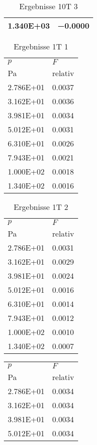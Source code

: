 \begin{table}
\begin{tabular}{l l }
\num{1.340E+03}&\num{-0.0000}\\
\bottomrule
\end{tabular}\caption{Ergebnisse 10T 3}\end{table}\begin{table}\begin{tabular}{l l }
\toprule
$p$&$F$\\
 Pa & relativ \\\midrule
\num{2.786E+01}&\num{0.0037}\\
\num{3.162E+01}&\num{0.0036}\\
\num{3.981E+01}&\num{0.0034}\\
\num{5.012E+01}&\num{0.0031}\\
\num{6.310E+01}&\num{0.0026}\\
\num{7.943E+01}&\num{0.0021}\\
\num{1.000E+02}&\num{0.0018}\\
\num{1.340E+02}&\num{0.0016}\\
\bottomrule
\end{tabular}\caption{Ergebnisse 1T 1}\end{table}\begin{table}\begin{tabular}{l l }
\toprule
$p$&$F$\\
 Pa & relativ \\\midrule
\num{2.786E+01}&\num{0.0031}\\
\num{3.162E+01}&\num{0.0029}\\
\num{3.981E+01}&\num{0.0024}\\
\num{5.012E+01}&\num{0.0016}\\
\num{6.310E+01}&\num{0.0014}\\
\num{7.943E+01}&\num{0.0012}\\
\num{1.000E+02}&\num{0.0010}\\
\num{1.340E+02}&\num{0.0007}\\
\bottomrule
\end{tabular}\caption{Ergebnisse 1T 2}\end{table}\begin{table}\begin{tabular}{l l }
\toprule
$p$&$F$\\
 Pa & relativ \\\midrule
\num{2.786E+01}&\num{0.0034}\\
\num{3.162E+01}&\num{0.0034}\\
\num{3.981E+01}&\num{0.0034}\\
\num{5.012E+01}&\num{0.0034}\\

\end{tabular}
\end{table}
